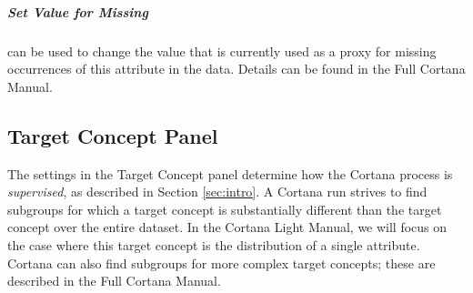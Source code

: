 \documentclass{article}
\newcommand{\todo}[1]{\textcolor{red}{[TODO: #1]}}
\begin{document}
\subparagraph{Set Value for Missing} can be used to change the value that is
currently used as a proxy for missing occurrences of this attribute in the
data. Details can be found in the Full Cortana Manual.


\subsection{Target Concept Panel}
\label{sec:targetconcept}

The settings in the Target Concept panel determine how the Cortana process
is \emph{supervised}, as described in Section \ref{sec:intro}.  A Cortana
run strives to find subgroups for which a target concept is substantially
different than the target concept over the entire dataset.  In the Cortana
Light Manual, we will focus on the case where this target concept is the
distribution of a single attribute.  Cortana can also find subgroups for
more complex target concepts; these are described in the Full Cortana
Manual.
\end{document}
